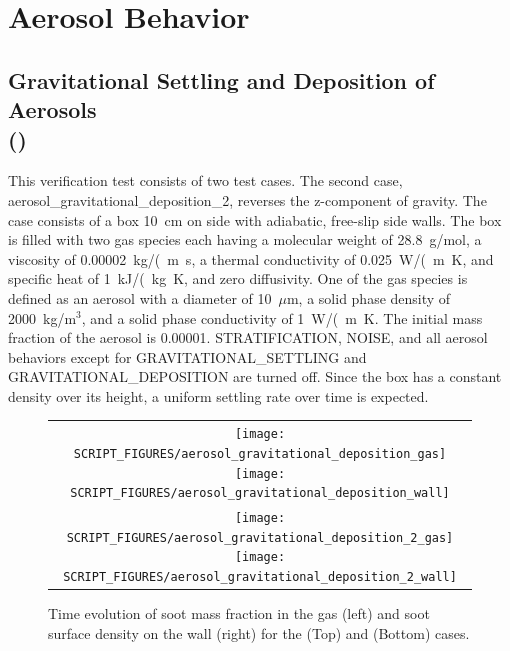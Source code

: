 \documentclass[11pt]{book}
\begin{document}
\section{Aerosol Behavior}
\subsection{Gravitational Settling and Deposition of Aerosols\\(\texorpdfstring{}{aerosol\_gravitational\_deposition})}
	\label{aerosol_gravitational_deposition}

This verification test consists of two test cases. The second case, {\ct aerosol\_gravitational\_deposition\_2}, reverses the z-component of gravity. The case consists of a box 10~cm on side with adiabatic, free-slip side walls. The box is filled with two gas species each having a molecular weight of 28.8~g/mol, a viscosity of 0.00002~\si{kg/(m.s}, a thermal conductivity of 0.025~\si{W/(m.K}, and specific heat of 1~\si{kJ/(kg.K}, and zero diffusivity. One of the gas species is defined as an aerosol with a diameter of 10~$\mu$m, a solid phase density of 2000~kg/m$^3$, and a solid phase conductivity of 1~\si{W/(m.K}. The initial mass fraction of the aerosol is 0.00001. {\ct STRATIFICATION}, {\ct NOISE}, and all aerosol behaviors except for {\ct GRAVITATIONAL\_SETTLING} and {\ct GRAVITATIONAL\_DEPOSITION} are turned off. Since the box has a constant density over its height, a uniform settling rate over time is expected.

\begin{figure}[ht]
	\centering
	\begin{tabular}{c}
		\texttt{[image: SCRIPT\_FIGURES/aerosol\_gravitational\_deposition\_gas]}
		\texttt{[image: SCRIPT\_FIGURES/aerosol\_gravitational\_deposition\_wall]} \\
		\texttt{[image: SCRIPT\_FIGURES/aerosol\_gravitational\_deposition\_2\_gas]}
		\texttt{[image: SCRIPT\_FIGURES/aerosol\_gravitational\_deposition\_2\_wall]}
	\end{tabular}
	\caption[Gas phase soot mass fractions and wall surface densities for gravitational deposition]{Time evolution of soot mass fraction in the gas (left) and soot surface density on the wall (right) for the  (Top) and  (Bottom) cases.}
	\label{fig:gravitational_deposition}
\end{figure}
\end{document}
